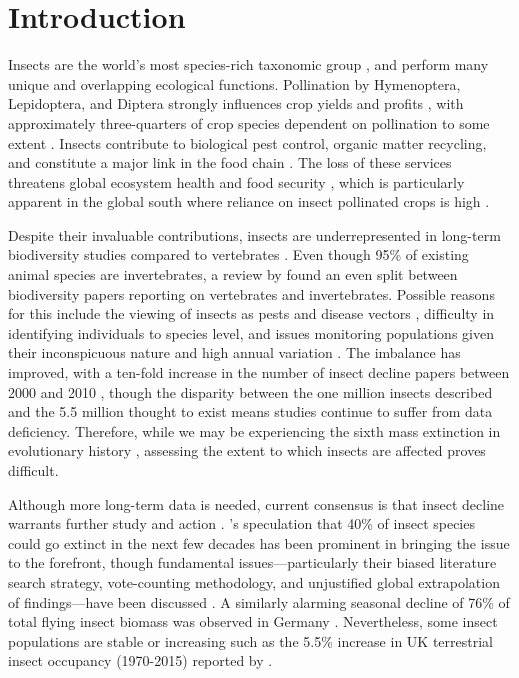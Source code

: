 \documentclass[11pt]{article}
\begin{document}
	\clearpage 
	
	\section{Introduction}
		Insects are the world’s most species-rich taxonomic group \citep{homburg2019have,cardoso2020scientists}, and perform many unique and overlapping ecological functions. Pollination by Hymenoptera, Lepidoptera, and Diptera strongly influences crop yields and profits \citep{habel2019mitigating}, with approximately three-quarters of crop species dependent on pollination to some extent \citep{klein2007importance}. Insects contribute to biological pest control, organic matter recycling, and constitute a major link in the food chain \citep{sanchez2019worldwide}. The loss of these services threatens global ecosystem health and food security \citep{potts2016safeguarding}, which is particularly apparent in the global south where reliance on insect pollinated crops is high \citep{dicks2021global}. 
		
		\noindent Despite their invaluable contributions, insects are underrepresented in long-term biodiversity studies compared to vertebrates \citep{outhwaite2020complex,wagner2021insect}. Even though 95\% of existing animal species are invertebrates, a review by \citet{titley2017scientific} found an even split between biodiversity papers reporting on vertebrates and invertebrates. Possible reasons for this include the viewing of insects as pests and disease vectors \citep{lawton1998biodiversity,milivcic2021insect}, difficulty in identifying individuals to species level, and issues monitoring populations given their inconspicuous nature and high annual variation \citep{fox2019insect}. The imbalance has improved, with a ten-fold increase in the number of insect decline papers between 2000 and 2010 \citep{eggleton2020state}, though the disparity between the one million insects described and the 5.5 million thought to exist \citep{stork2018many} means studies continue to suffer from data deficiency. Therefore, while we may be experiencing the sixth mass extinction in evolutionary history \citep{dirzo2014defaunation}, assessing the extent to which insects are affected proves difficult. 
		
		\noindent Although more long-term data is needed, current consensus is that insect decline warrants further study and action \citep{montgomery2020insect}. \citet{sanchez2019worldwide}'s speculation that 40\% of insect species could go extinct in the next few decades has been prominent in bringing the issue to the forefront, though fundamental issues—particularly their biased literature search strategy, vote-counting methodology, and unjustified global extrapolation of findings—have been discussed \citep{simmons2019worldwide,saunders2020moving}. A similarly alarming seasonal decline of 76\% of total flying insect biomass was observed in Germany \citep{hallmann2017more}. Nevertheless, some insect populations are stable or increasing \citep{boyes2019bucking,wagner2021insect} such as the 5.5\% increase in UK terrestrial insect occupancy (1970-2015) reported by \citet{outhwaite2020complex}. 
		
\end{document}
